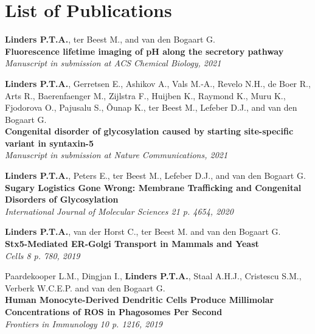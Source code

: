 \cleartoleftpage

\section{List of Publications}

\noindent\textbf{Linders P.T.A.}, ter Beest M., and van den Bogaart G. \\
\textbf{Fluorescence lifetime imaging of pH along the secretory pathway} \\
\emph{Manuscript in submission at ACS Chemical Biology, 2021}

\vspace{\baselineskip}

\noindent\textbf{Linders P.T.A.}, Gerretsen E., Ashikov A., Vals M.-A., Revelo N.H., de Boer R., Arts R., Baerenfaenger M., Zijlstra F., Huijben K., Raymond K., Muru K., Fjodorova O., Pajusalu S., Õunap K., ter Beest M., Lefeber D.J., and van den Bogaart G. \\
\textbf{Congenital disorder of glycosylation caused by starting site-specific variant in syntaxin-5} \\
\emph{Manuscript in submission at Nature Communications, 2021}

\vspace{\baselineskip}

\noindent\textbf{Linders P.T.A.}, Peters E., ter Beest M., Lefeber D.J., and van den Bogaart G. \\
\textbf{Sugary Logistics Gone Wrong: Membrane Trafficking and Congenital Disorders of Glycosylation} \\
\emph{International Journal of Molecular Sciences 21 p. 4654, 2020}

\vspace{\baselineskip}

\noindent\textbf{Linders P.T.A.}, van der Horst C., ter Beest M. and van den Bogaart G. \\
\textbf{Stx5-Mediated ER-Golgi Transport in Mammals and Yeast} \\
\emph{Cells 8 p. 780, 2019}

\vspace{\baselineskip}

\noindent Paardekooper L.M., Dingjan I., \textbf{Linders P.T.A.}, Staal A.H.J., Cristescu S.M., Verberk W.C.E.P. and van den Bogaart G. \\
\textbf{Human Monocyte-Derived Dendritic Cells Produce Millimolar Concentrations of ROS in Phagosomes Per Second} \\
\emph{Frontiers in Immunology 10 p. 1216, 2019}

